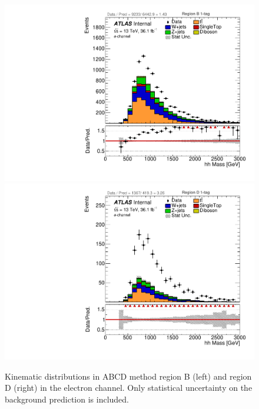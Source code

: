 \begin{figure}[!htbp]
\begin{center}
\includegraphics[scale=0.33]{./figures/boosted/ABCD_1tag0bjet/elec_Inc_RegionB_hhMass}    
\includegraphics[scale=0.33]{./figures/boosted/ABCD_1tag0bjet/elec_Inc_RegionD_hhMass}    
\caption{Kinematic distributions in ABCD method region B (left) and region D (right) in the electron channel.
Only statistical uncertainty on the background prediction is included.}
\label{fig:boosted_abcd_1tag0bjet_region_bd_elec}
\end{center}
\end{figure}

